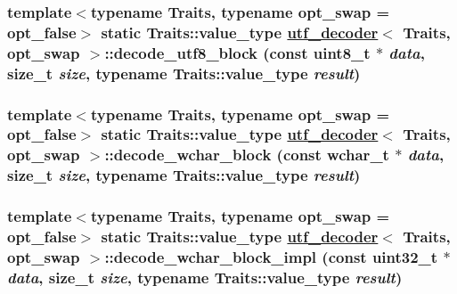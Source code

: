 \hypertarget{structutf__decoder_671829bbdba1eac5c8bd2bf781eae498}{
\subsubsection[decode\_\-utf8\_\-block]{\setlength{\rightskip}{0pt plus 5cm}template$<$typename Traits, typename opt\_\-swap = opt\_\-false$>$ static Traits::value\_\-type \hyperlink{structutf__decoder}{utf\_\-decoder}$<$ Traits, opt\_\-swap $>$::decode\_\-utf8\_\-block (const uint8\_\-t $\ast$ {\em data}, size\_\-t {\em size}, typename Traits::value\_\-type {\em result})}}
\label{structutf__decoder_671829bbdba1eac5c8bd2bf781eae498}


\hypertarget{structutf__decoder_5953fd0661c64408e08161342e4c538d}{
\subsubsection[decode\_\-wchar\_\-block]{\setlength{\rightskip}{0pt plus 5cm}template$<$typename Traits, typename opt\_\-swap = opt\_\-false$>$ static Traits::value\_\-type \hyperlink{structutf__decoder}{utf\_\-decoder}$<$ Traits, opt\_\-swap $>$::decode\_\-wchar\_\-block (const wchar\_\-t $\ast$ {\em data}, size\_\-t {\em size}, typename Traits::value\_\-type {\em result})}}
\label{structutf__decoder_5953fd0661c64408e08161342e4c538d}


\hypertarget{structutf__decoder_3bd423d3ce99b245c76be8a0796d951b}{
\subsubsection[decode\_\-wchar\_\-block\_\-impl]{\setlength{\rightskip}{0pt plus 5cm}template$<$typename Traits, typename opt\_\-swap = opt\_\-false$>$ static Traits::value\_\-type \hyperlink{structutf__decoder}{utf\_\-decoder}$<$ Traits, opt\_\-swap $>$::decode\_\-wchar\_\-block\_\-impl (const uint32\_\-t $\ast$ {\em data}, size\_\-t {\em size}, typename Traits::value\_\-type {\em result})}}
\label{structutf__decoder_3bd423d3ce99b245c76be8a0796d951b}


